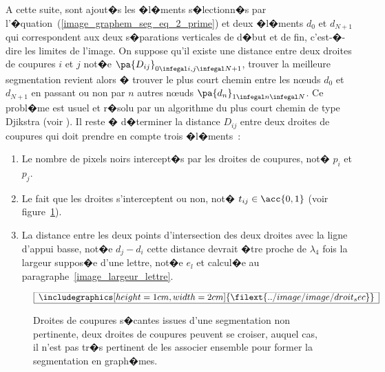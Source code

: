 A cette suite, sont ajout�s les �l�ments s�lectionn�s par l'�quation~(\ref{image_graphem_seg_eq_2_prime}) et deux �l�ments $d_0$ et $d_{N+1}$ qui correspondent aux deux s�parations verticales de d�but et de fin, c'est-�-dire les limites de l'image. On suppose qu'il existe une distance entre deux droites de coupures $i$ et $j$ not�e $\pa{D_{ij}}_{ 0 \infegal i,j \infegal N+1 }$, trouver la meilleure segmentation revient alors � trouver le plus court chemin entre les n\oe uds $d_0$ et $d_{N+1}$ en passant ou non par $n$ autres n\oe uds $\pa{d_n}_{ 1 \infegal n \infegal N }$. Ce probl�me est usuel et r�solu par un algorithme du plus court chemin de type Djikstra (voir ). Il reste � d�terminer la distance $D_{ij}$ entre deux droites de coupures qui doit prendre en compte trois �l�ments~:


        \begin{enumerate}
        \item Le nombre de pixels noirs intercept�s par les droites de coupures, not� $p_i$ et $p_j$.
        \item Le fait que les droites s'interceptent ou non, not� $t_{ij} \in \acc{0,1}$ 
                        (voir figure~\ref{image_droite_coupure_croisees}).
        \item La distance entre les deux points d'intersection des deux droites avec la ligne d'appui basse, 
                        not�e $d_j - d_i$ cette distance devrait �tre proche de 
                        $\lambda_4$ fois la largeur suppos�e d'une lettre, not�e $e_l$ et calcul�e au 
                        paragraphe~\ref{image_largeur_lettre}.
        \end{enumerate}
        


            \begin{figure}[ht]
        $$\frame{$\begin{array}[c]{c}\includegraphics[height=1cm, width=2cm]
        {\filext{../image/image/droit_sec}}\end{array}$}$$
        \caption{    Droites de coupures s�cantes issues d'une segmentation non pertinente, 
                            deux droites de coupures peuvent se croiser, auquel cas, 
                            il n'est pas tr�s pertinent de les associer ensemble pour former la segmentation en graph�mes. }
        \label{image_droite_coupure_croisees}
            \end{figure}

